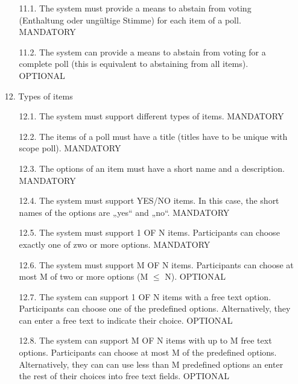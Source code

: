 \begin{enumerate}
	\begin{enumerate}
	\item[11.1.] The system must provide a means to abstain from voting (Enthaltung oder ungültige
	Stimme) for each item of a poll. MANDATORY
	
	
	\item[11.2.] The system can provide a means to abstain from voting for a complete poll (this is equivalent
	to abstaining from all items). OPTIONAL
	
	\end{enumerate}



\item[12.] Types of items

	\begin{enumerate}
	\item[12.1.] The system must support different types of items. MANDATORY
	
	
	\item[12.2.] The items of a poll must have a title (titles have to be unique with scope poll). MANDATORY
	
	
	\item[12.3.] The options of an item must have a short name and a description. MANDATORY
	
	
	\item[12.4.] The system must support YES/NO items. In this case, the short names of the options are
	„yes“ and „no“. MANDATORY
	
	
	\item[12.5.] The system must support 1 OF N items. Participants can choose exactly one of zwo or
	more options. MANDATORY
	
	
	\item[12.6.] The system must support M OF N items. Participants can choose at most M of two or
	more options (M $\leq$ N). OPTIONAL
	
	
	\item[12.7.] The system can support 1 OF N items with a free text option. Participants can choose one
	of the predefined options. Alternatively, they can enter a free text to indicate their choice.
	OPTIONAL
	
	
	\item[12.8.] The system can support M OF N items with up to M free text options. Participants can
	choose at most M of the predefined options. Alternatively, they can can use less than M
	predefined options an enter the rest of their choices into free text fields. OPTIONAL
	\end{enumerate}





\end{enumerate}
